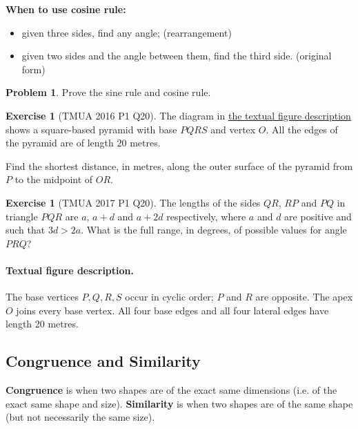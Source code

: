 \documentclass[11pt]{article}
\theoremstyle{definition}
\newtheorem{example}[theorem]{Exercise}
\newtheorem{problem}[theorem]{Problem}
\theoremstyle{remark}
\begin{document}
\textbf{When to use cosine rule:}
\begin{itemize}
    \item given three sides, find any angle; (rearrangement)
    \item given two sides and the angle between them, find the third side. (original form)
\end{itemize}

\begin{problem}\label{tmua-3-unit-004}
    Prove the sine rule and cosine rule.
\end{problem}

\begin{example}[TMUA 2016 P1 Q20]\label{tmua-3-unit-005}
    The diagram in \hyperref[fig:tmua-2016-p1-q20]{the textual figure description} shows a square-based pyramid with base \(PQRS\) and vertex \(O\). All the edges of the pyramid are of length \(20\) metres.

    Find the shortest distance, in metres, along the outer surface of the pyramid from \(P\) to the midpoint of \(OR\).
\end{example}

\begin{example}[TMUA 2017 P1 Q20]\label{tmua-3-unit-006}
    The lengths of the sides \(QR\), \(RP\) and \(PQ\) in triangle \(PQR\) are \(a\), \(a + d\) and \(a + 2d\) respectively, where \(a\) and \(d\) are positive and such that \(3d > 2a\). What is the full range, in degrees, of possible values for angle \(PRQ\)?    
\end{example}

\paragraph{Textual figure description.}\label{fig:tmua-2016-p1-q20}
The base vertices \(P,Q,R,S\) occur in cyclic order; \(P\) and \(R\) are opposite. The apex \(O\) joins every base vertex. All four base edges and all four lateral edges have length 20 metres.


\subsection{Congruence and Similarity}\label{tmua-3-subsection-002}

\textbf{Congruence} is when two shapes are of the exact same dimensions (i.e. of the exact same shape and size). \textbf{Similarity} is when two shapes are of the same shape (but not necessarily the same size).
\end{document}
